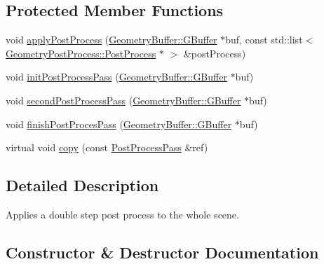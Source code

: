 \subsection*{Protected Member Functions}
\begin{DoxyCompactItemize}
\item 
void \mbox{\hyperlink{class_geometry_engine_1_1_geometry_render_step_1_1_post_process_pass_ac0f109e5dc7fb598c2613daaff285526}{apply\+Post\+Process}} (\mbox{\hyperlink{class_geometry_engine_1_1_geometry_buffer_1_1_g_buffer}{Geometry\+Buffer\+::\+G\+Buffer}} $\ast$buf, const std\+::list$<$ \mbox{\hyperlink{class_geometry_engine_1_1_geometry_post_process_1_1_post_process}{Geometry\+Post\+Process\+::\+Post\+Process}} $\ast$ $>$ \&post\+Process)
\item 
void \mbox{\hyperlink{class_geometry_engine_1_1_geometry_render_step_1_1_post_process_pass_ae0bfafe4123decb5eb65e1decc3c07ba}{init\+Post\+Process\+Pass}} (\mbox{\hyperlink{class_geometry_engine_1_1_geometry_buffer_1_1_g_buffer}{Geometry\+Buffer\+::\+G\+Buffer}} $\ast$buf)
\item 
void \mbox{\hyperlink{class_geometry_engine_1_1_geometry_render_step_1_1_post_process_pass_a3d555943a9bc2b3105e71b8984b1ce0b}{second\+Post\+Process\+Pass}} (\mbox{\hyperlink{class_geometry_engine_1_1_geometry_buffer_1_1_g_buffer}{Geometry\+Buffer\+::\+G\+Buffer}} $\ast$buf)
\item 
void \mbox{\hyperlink{class_geometry_engine_1_1_geometry_render_step_1_1_post_process_pass_abfc2e269aad1157916f6c3c72b570ae9}{finish\+Post\+Proces\+Pass}} (\mbox{\hyperlink{class_geometry_engine_1_1_geometry_buffer_1_1_g_buffer}{Geometry\+Buffer\+::\+G\+Buffer}} $\ast$buf)
\item 
virtual void \mbox{\hyperlink{class_geometry_engine_1_1_geometry_render_step_1_1_post_process_pass_a5279399395c18ac4ef35fa3028aa4950}{copy}} (const \mbox{\hyperlink{class_geometry_engine_1_1_geometry_render_step_1_1_post_process_pass}{Post\+Process\+Pass}} \&ref)
\end{DoxyCompactItemize}


\subsection{Detailed Description}
Applies a double step post process to the whole scene. 

\subsection{Constructor \& Destructor Documentation}
\mbox{\label{class_geometry_engine_1_1_geometry_render_step_1_1_post_process_pass_a79e267f8b485ebd55a9ac01ed0717f02}} 
